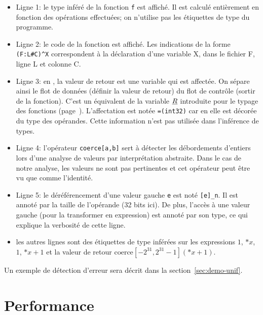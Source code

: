 \begin{itemize}
    \item Ligne 1: le type inféré de la fonction \texttt{f} est affiché. Il est
        calculé entièrement en fonction des opérations effectuées; on n'utilise
        pas les étiquettes de type du programme.

    \item Ligne 2: le code de la fonction est affiché. Les indications de la
        forme \texttt{(F:L\#C)\^{}X} correspondent à la déclaration d'une
        variable X, dans le fichier F, ligne L et colonne C.

    \item Ligne 3: en \newspeak, la valeur de retour est une variable qui est
        affectée. On sépare ainsi le flot de données (définir la valeur de
        retour) du flot de contrôle (sortir de la fonction). C'est un équivalent
        de la variable $\underline{R}$ introduite pour le typage des fonctions
        (page~\pageref{sec:typ-fun}). L'affectation est notée \texttt{=(int32)}
        car en \newspeak elle est décorée du type des opérandes. Cette
        information n'est pas utilisée dans l'inférence de types.

    \item Ligne 4: l'opérateur \texttt{coerce[a,b]} sert à détecter les
        débordements d'entiers lors d'une analyse de valeurs par interprétation
        abstraite. Dans le cas de notre analyse, les valeurs ne sont pas
        pertinentes et cet opérateur peut être vu que comme l'identité.

    \item Ligne 5: le déréférencement d'une valeur gauche \texttt{e} est noté
        \texttt{[e]\_n}. Il est annoté par la taille de l'opérande (32 bits
        ici). De plus, l'accès à une valeur gauche (pour la transformer en
        expression) est annoté par son type, ce qui explique la verbosité de
        cette ligne.

    \item les autres lignes sont des étiquettes de type inférées sur les
        expressions $1$, $*x$, $1$, $*x + 1$ et la valeur de retour
        $\mathrm{coerce}[-2^{31},2^{31}-1](*x + 1)$.

\end{itemize}

Un exemple de détection d'erreur sera décrit dans la section~\ref{sec:demo-unif}.

\section{Performance}


